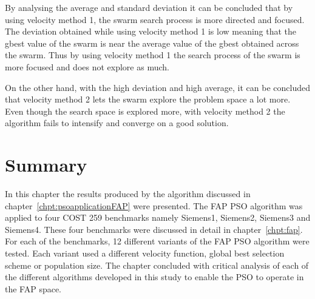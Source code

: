 By analysing the average and standard deviation it can be concluded that by using velocity method 1, the swarm search process is more directed and focused. The deviation obtained while using velocity method 1 is low meaning that the gbest value of the swarm is near the average value of the gbest obtained across the swarm. Thus by using velocity method 1 the search process of the swarm is more focused and does not explore as much.

On the other hand, with the high deviation and high average, it can be concluded that velocity method 2 lets the swarm explore the problem space a lot more. Even though the search space is explored more, with velocity method 2 the algorithm fails to intensify and converge on a good solution.

\section{Summary}
In this chapter the results produced by the algorithm discussed in chapter~\ref{chpt:psoapplicationFAP} were presented. The FAP PSO algorithm was applied to four COST 259 benchmarks namely Siemens1, Siemens2, Siemens3 and Siemens4. These four benchmarks were discussed in detail in chapter~\ref{chpt:fap}. For each of the benchmarks, 12 different variants of the FAP PSO algorithm were tested. Each variant used a different velocity function, global best selection scheme or population size. The chapter concluded with critical analysis of each of the different algorithms developed in this study to enable the PSO to operate in the FAP space.
